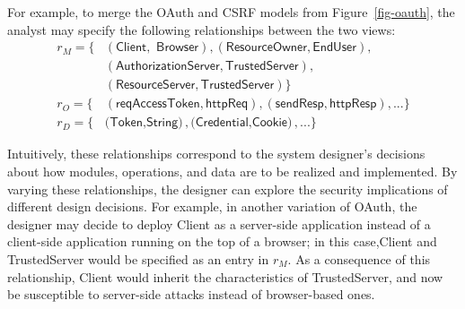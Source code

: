 For example, to merge the OAuth and CSRF models from
Figure~\ref{fig-oauth}, the analyst may specify the following
relationships between the two views:
\begin{align*}
   r_{M} = \{&(\textsf{Client$,$ Browser}),(\textsf{ResourceOwner$,$
    EndUser}), \\&(\textsf{AuthorizationServer$,$
    TrustedServer}),\\&(\textsf{ResourceServer$,$
    TrustedServer})\} \\
  r_{O} = \{&(\textsf{reqAccessToken$,$httpReq}),(\textsf{sendResp$,$httpResp}),  ...\}\\
  r_{D} =
  \{&\textsf{(Token$,$String)},\textsf{(Credential$,$Cookie)}, ...\} 
\end{align*}

Intuitively, these relationships correspond to the system designer's
decisions about how modules, operations, and data are to be realized
and implemented. By varying these relationships, the designer can
explore the security implications of different design decisions. For
example, in another variation of OAuth, the designer may decide to
deploy \textsf{Client} as a server-side application instead of a
client-side application running on the top of a browser; in this
case,\textsf{Client} and \textsf{TrustedServer} would be specified as
an entry in $r_{M}$. As a consequence of this relationship,
\textsf{Client} would inherit the characteristics of
\textsf{TrustedServer}, and now be susceptible to server-side attacks
instead of browser-based ones.

